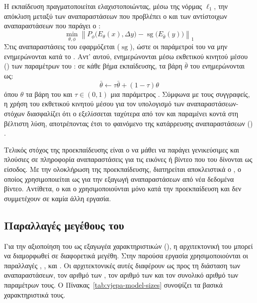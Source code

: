 Η εκπαίδευση πραγματοποιείται ελαχιστοποιώντας, μέσω της νόρμας
$\ell_1$, την απόκλιση μεταξύ των αναπαραστάσεων που προβλέπει ο
 και των αντίστοιχων αναπαραστάσεων που παράγει ο
:
\begin{equation}
    \min_{\theta,\phi} \left\| P_\phi\big(E_\theta(x), \Delta y\big)
    - \operatorname{sg}\big(E_{\bar\theta}(y)\big) \right\|_1
\end{equation}
Στις αναπαραστάσεις του  εφαρμόζεται 
($\operatorname{sg}$), ώστε οι παράμετροί του να μην ενημερώνονται κατά το
. Αντ' αυτού, ενημερώνονται μέσω εκθετικού κινητού
μέσου () των παραμέτρων του : σε κάθε βήμα εκπαίδευσης, τα βάρη $\bar\theta$ του  ενημερώνονται ως:
\begin{equation}  
    \bar\theta \leftarrow \tau \bar\theta + (1 - \tau)\theta
\end{equation}
όπου $\theta$ τα βάρη του  και $\tau \in (0,1)$ μια
παράμετρος . Σύμφωνα με τους συγγραφείς, η χρήση του
εκθετικού κινητού μέσου για τον υπολογισμό των αναπαραστάσεων-στόχων
διασφαλίζει ότι ο  εξελίσσεται ταχύτερα από τον  και παραμένει κοντά στη βέλτιστη λύση, αποτρέποντας έτσι το
φαινόμενο της κατάρρευσης αναπαραστάσεων ()
\cite{adrien2023v-jepa}.

Τελικός στόχος της προεκπαίδευσης είναι ο  να μάθει
να παράγει γενικεύσιμες και πλούσιες σε πληροφορία αναπαραστάσεις για τις εικόνες ή βίντεο που του δίνονται ως είσοδος. Με την
ολοκλήρωση της προεκπαίδευσης, διατηρείται αποκλειστικά ο , ο οποίος χρησιμοποιείται ως  για την εξαγωγή
αναπαραστάσεων από νέα δεδομένα βίντεο. Αντίθετα, ο 
και ο  χρησιμοποιούνται μόνο κατά την προεκπαίδευση και δεν
συμμετέχουν σε καμία άλλη εργασία.

\subsection{Παραλλαγές μεγέθους του }
\label{subsec:vjepa-model-sizes}

Για την αξιοποίηση του  ως εξαγωγέα χαρακτηριστικών (), η
αρχιτεκτονική του μπορεί να διαμορφωθεί σε διαφορετικά μεγέθη. Στην παρούσα
εργασία χρησιμοποιούνται οι παραλλαγές , ,  και
. Οι αρχιτεκτονικές αυτές διαφέρουν ως προς τη διάσταση των
αναπαραστάσεων, τον αριθμό των , τον αριθμό των
 και τον συνολικό αριθμό των παραμέτρων τους. Ο
Πίνακας~\ref{tab:vjepa-model-sizes} συνοψίζει τα βασικά χαρακτηριστικά τους.

